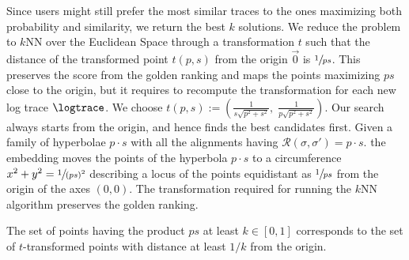 %
{Since users might still prefer the most similar traces to the ones maximizing both probability and similarity, we 
	return the best $k$ solutions.
	We reduce the problem to $k$NN over the Euclidean Space through a transformation $t$ such that the distance of the 
	transformed point $t(p,s)$ from  the origin $\vec{0}$ is $\sfrac{1}{ps}$. This preserves the score from the golden ranking 
	and maps the points maximizing $ps$ close to the origin, but it requires to recompute the transformation for each new log trace $\logtrace$. We choose}
$t(p,s):=\left(\frac{1}{s\sqrt{p^2+s^2}},\; \frac{1}{p\sqrt{p^2+s^2}}\right)$. 
Our search always starts from the origin, and hence finds the best candidates first.
%
	{Given a family of hyperbolae $p\cdot s$ with all the alignments having 
		$\mathcal{R}(\sigma,\sigma')=p\cdot s$. 
%		
	the embedding moves the points of the hyperbola $p\cdot s$ to a circumference $x^2+y^2=\sfrac{1}{(ps)^2}$ describing a locus of the points equidistant as $\sfrac{1}{ps}$ from the origin of the axes $(0,0)$.}
%
The transformation required for running the $k$NN algorithm preserves the golden ranking.

\begin{lemma}
	\label{lem:transfspace}
	The set of points having the product $ps$ at least $k\in[0,1]$ corresponds to the set of $t$-transformed points with distance 
	at least $1/k$ from the origin.
\end{lemma}

